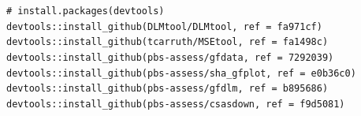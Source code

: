 \documentclass[11pt]{book}
\begin{document}
\texttt{\#\ install.packages(\textquotesingle{}devtools\textquotesingle{})}\\
\texttt{devtools::install\_github(\textquotesingle{}DLMtool/DLMtool\textquotesingle{},\ ref\ =\ \textquotesingle{}fa971cf\textquotesingle{})}~\\
\texttt{devtools::install\_github(\textquotesingle{}tcarruth/MSEtool\textquotesingle{},\ ref\ =\ \textquotesingle{}fa1498c\textquotesingle{})}~\\
\texttt{devtools::install\_github(\textquotesingle{}pbs-assess/gfdata\textquotesingle{},\ ref\ =\ \textquotesingle{}7292039\textquotesingle{})}~\\
\texttt{devtools::install\_github(\textquotesingle{}pbs-assess/sha\_gfplot\textquotesingle{},\ ref\ =\ \textquotesingle{}e0b36c0\textquotesingle{})}~\\
\texttt{devtools::install\_github(\textquotesingle{}pbs-assess/gfdlm\textquotesingle{},\ ref\ =\ \textquotesingle{}b895686\textquotesingle{})}~\\
\texttt{devtools::install\_github(\textquotesingle{}pbs-assess/csasdown\textquotesingle{},\ ref\ =\ \textquotesingle{}f9d5081\textquotesingle{})}~\\

\clearpage
\end{document}
